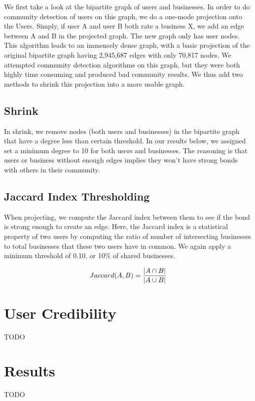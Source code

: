 \documentclass[10pt]{article}
\begin{document}
We first take a look at the bipartite graph of users and businesses.  In order to do community detection of users on this graph, we do a one-mode projection onto the Users.  Simply, if user A and user B both rate a business X, we add an edge between A and B in the projected graph.  The new graph only has user nodes.  This algorithm leads to an immensely dense graph, with a basic projection of the original bipartite graph having 2,945,687 edges with only 70,817 nodes.  We attempted community detection algorithms on this graph, but they were both highly time consuming and produced bad community results.  We thus add two methods to shrink this projection into a more usable graph.

\subsection{Shrink}
In shrink, we remove nodes (both users and businesses) in the bipartite graph that have a degree less than certain threshold.  In our results below, we assigned set a minimum degree to 10 for both users and businesses.  The reasoning is that users or business without enough edges implies they won't have strong bonds with others in their community.

\subsection{Jaccard Index Thresholding}
When projecting, we compute the Jaccard index between them to see if the bond is strong enough to create an edge.  Here, the Jaccard index is a statistical property of two users by computing the ratio of number of intersecting businesses to total businesses that these two users have in common.  We again apply a minimum threshold of 0.10, or 10\% of shared businesses.

\begin{equation}
Jaccard(A,B) = {{|A \cap B|}\over{|A \cup B|}}
\end{equation}

\section{User Credibility}

TODO

\section{Results}
\label{sec:results}
TODO
\end{document}
